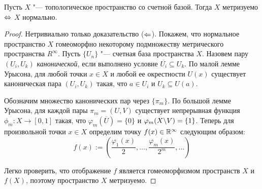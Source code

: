 \begin{theorem}
    Пусть $X$ "--- топологическое пространство со счетной базой. Тогда $X$ метризуемо $\Leftrightarrow$ $X$ нормально.
\end{theorem}

\begin{proof}
    Нетривиально только доказательство ($\Leftarrow$). Покажем, что нормальное пространство $X$ гомеоморфно некоторому подмножеству метрического пространства $R^\infty$. Пусть $\{U_n\}$  "--- счетная база пространства $X$. Назовем пару $(U_i, U_k)$ \textit{канонической}, если выполнено условие $\overline{U_i}\subseteq U_k$. По малой лемме Урысона, для любой точки $x \in X$ и любой ее окрестности $U(x)$ существует каноническая пара $(U_i, U_k)$ такая, что $a \in U_i$ и $U_k \subseteq U(a)$.
    
    Обозначим множество канонических пар через $\{\pi_m\}$. По большой лемме Урысона, для каждой пары $\pi_m = (U, V)$ существует непрерывная функция $\phi_m : X \rightarrow [0, 1]$ такая, что $\varphi_m(\overline U) = \{0\}$ и $\varphi_m(X \backslash V) = \{1\}$. Теперь для произвольной точки $x \in X$ определим точку $f(x) \in \mathbb{R}^\infty$ следующим образом:
    \[f(x) := \left(\frac{\varphi_1(x)}{2}, \dotsc, \frac{\varphi_m(x)}{2^m}, \dotsc\right)\]

    Легко проверить, что отображение $f$ является гомеоморфизмом пространств $X$ и $f(X)$, поэтому пространство $X$ метризуемо.
\end{proof}